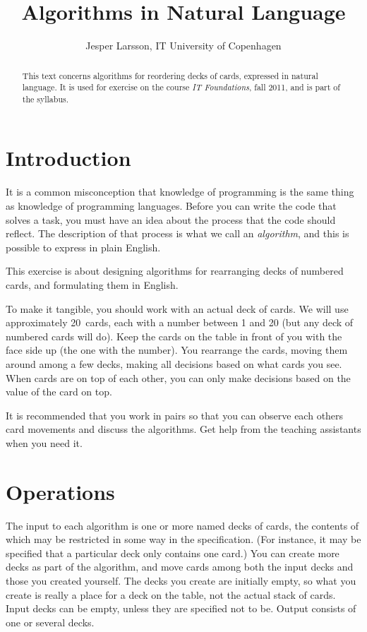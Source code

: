 \documentclass[a4paper,twoside]{tufte-handout}
\title{Algorithms in Natural Language}
\author{Jesper Larsson, IT University of Copenhagen}
\date{}
\begin{document}
\maketitle

\begin{abstract}
  This text concerns algorithms for reordering decks of cards,
  expressed in natural language. It is used for exercise on the course
  \emph{IT Foundations}, fall 2011, and is part of the syllabus.
\end{abstract}

\section{Introduction}\label{sec-intro}

It is a common misconception that knowledge of programming is the same
thing as knowledge of programming languages. Before you can write the
code that solves a task, you must have an idea about the process that
the code should reflect. The description of that process is what we
call an \emph{algorithm}, and this is possible to express in plain
English.

This exercise is about designing algorithms for rearranging decks of
numbered cards, and formulating them in English.

To make it tangible, you should work with an actual deck of
cards. We will use approximately 20~cards, each with a number between
1 and 20 (but any deck of numbered cards will do). Keep the cards on
the table in front of you with the face side up (the one with the
number). You rearrange the cards, moving them around among a
few decks, making all decisions based on what cards you see. When
cards are on top of each other, you can only make decisions based on
the value of the card on top.

It is recommended that you work in pairs so that you can observe each
others card movements and discuss the algorithms. Get help from the
teaching assistants when you need it.

\section{Operations}\label{sec-ops}

The input to each algorithm is one or more named decks of cards, the
contents of which may be restricted in some way in the
specification. (For instance, it may be specified that a particular
deck only contains one card.) You can create more decks as part of the
algorithm, and move cards among both the input decks and those you
created yourself. The decks you create are initially empty, so what
you create is really a place for a deck on the table, not the actual
stack of cards. Input decks can be empty, unless they are specified
not to be. Output consists of one or several decks.
\end{document}
